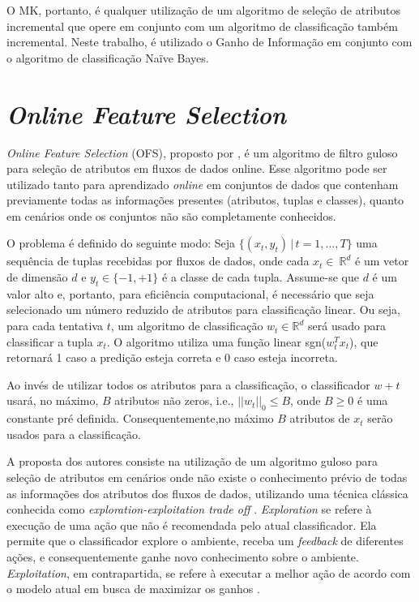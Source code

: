 O MK, portanto, é qualquer utilização de um algoritmo de seleção de atributos incremental que opere em conjunto com um algoritmo de classificação também incremental. Neste trabalho, é utilizado o Ganho de Informação \cite{Quinlan1986} em conjunto com o algoritmo de classificação 
Naïve Bayes.

\section{\textit{Online Feature Selection}}\label{sec:mrec} 

\textit{Online Feature Selection} 
(OFS),
proposto por , é um algoritmo de filtro guloso para seleção de atributos em fluxos de dados online. Esse algoritmo pode ser utilizado tanto para aprendizado \textit{online} em conjuntos de dados que contenham previamente todas as informações presentes (atributos, tuplas e classes), quanto em cenários onde os conjuntos não são completamente conhecidos.

O problema é definido do seguinte modo: Seja $ \{( x_t,y_t ) \, | \, t = 1,\dots,T \} $ uma sequência de tuplas recebidas por fluxos de dados, onde cada $x_t \in \ \mathbb{R}^{d}$ é um vetor de dimensão $d$ e $y_t \in \{-1,+1\}$ é a classe de cada tupla. Assume-se que $d$ é um valor alto e, portanto, para eficiência computacional, é necessário que seja selecionado um número reduzido de atributos para classificação linear. Ou seja, para cada tentativa $t$, um algoritmo de classificação $w_t \in \mathbb{R}^{d}$ será usado para classificar a tupla $x_t$. O algoritmo utiliza uma função linear sgn($w_t^{T} x_t$), que retornará 1 caso a predição esteja correta e 0 caso esteja incorreta.

Ao invés de utilizar todos os atributos para a classificação, o classificador $w+t$ usará, no máximo, $B$ atributos não zeros, i.e., $||w_t||_0 \leq B$, onde $B \geq 0$ é uma constante pré definida. Consequentemente,no máximo $B$ atributos de $x_t$ serão usados para a classificação.

A proposta dos autores consiste na utilização de um algoritmo guloso para seleção de atributos em cenários onde não existe o conhecimento prévio de todas as informações dos atributos dos fluxos de dados, utilizando uma técnica clássica conhecida como \textit{exploration-exploitation trade off} \cite{March1991}. \textit{Exploration} se refere  à execução de uma ação que não é recomendada pelo atual classificador. Ela permite que o classificador explore o ambiente, receba um \textit{feedback} de diferentes ações, e consequentemente ganhe novo conhecimento sobre o ambiente. \textit{Exploitation}, em contrapartida, se refere à executar a melhor ação de acordo com o modelo atual em busca de maximizar os ganhos \cite{Valizadegan2011}. 

